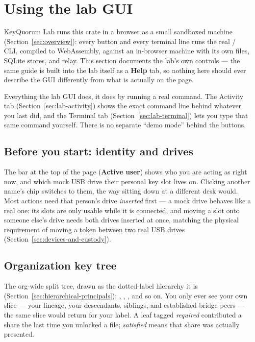 \section{Using the lab GUI}
\label{sec:lab-gui}

KeyQuorum Lab runs this crate in a browser as a small sandboxed machine
(Section~\ref{sec:overview}): every button and every terminal line runs the
real  /  CLI, compiled to
WebAssembly, against an in-browser machine with its own files, SQLite
stores, and relay. This section documents the lab's own controls --- the
same guide is built into the lab itself as a \textbf{Help} tab, so nothing
here should ever describe the GUI differently from what is actually on the
page.

\begin{noteBox}
Everything the lab GUI does, it does by running a real command. The
Activity tab (Section~\ref{sec:lab-activity}) shows the exact command line
behind whatever you last did, and the Terminal tab (Section~\ref{sec:lab-terminal})
lets you type that same command yourself. There is no separate ``demo
mode'' behind the buttons.
\end{noteBox}

\subsection{Before you start: identity and drives}

The bar at the top of the page (\textbf{Active user}) shows who you are
acting as right now, and which mock USB drive their personal key slot lives
on. Clicking another name's chip switches to them, the way sitting down at
a different desk would. Most actions need that person's drive
\emph{inserted} first --- a mock drive behaves like a real one: its slots
are only usable while it is connected, and moving a slot onto someone
else's drive needs both drives inserted at once, matching the physical
requirement of moving a token between two real USB drives
(Section~\ref{sec:devices-and-custody}).

\subsection{Organization key tree}

The org-wide split tree, drawn as the dotted-label hierarchy it is
(Section~\ref{sec:hierarchical-principals}): , ,
, and so on. You only ever see your own slice --- your
lineage, your descendants, siblings, and established-bridge peers --- the
same slice  would return for your label. A leaf
tagged \emph{required} contributed a share the last time you unlocked a
file; \emph{satisfied} means that share was actually presented.

